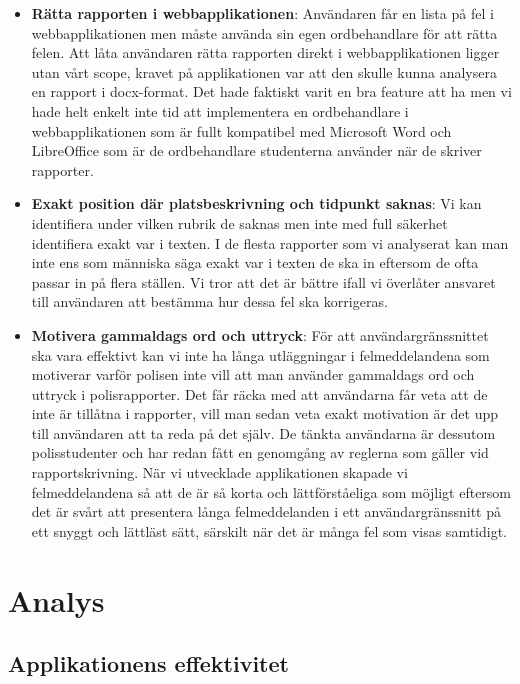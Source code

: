 \documentclass[swedish]{maucsthesis}
\begin{document}
\begin{itemize}
\item \textbf{Rätta rapporten i webbapplikationen}: Användaren får en lista på
  fel i webbapplikationen men måste använda sin egen ordbehandlare för att rätta
  felen. Att låta användaren rätta rapporten direkt i webbapplikationen ligger
  utan vårt scope, kravet på applikationen var att den skulle kunna analysera en
  rapport i docx-format. Det hade faktiskt varit en bra feature att ha men vi
  hade helt enkelt inte tid att implementera en ordbehandlare i
  webbapplikationen som är fullt kompatibel med Microsoft Word och LibreOffice som
  är de ordbehandlare studenterna använder när de skriver rapporter.
\item \textbf{Exakt position där platsbeskrivning och tidpunkt saknas}: Vi kan
  identifiera under vilken rubrik de saknas men inte med full säkerhet
  identifiera exakt var i texten. I de flesta rapporter som vi analyserat kan
  man inte ens som människa säga exakt var i texten de ska in eftersom de
  ofta passar in på flera ställen. Vi tror att det är bättre ifall vi överlåter
  ansvaret till användaren att bestämma hur dessa fel ska korrigeras.
\item \textbf{Motivera gammaldags ord och uttryck}: För att användargränssnittet
  ska vara effektivt kan vi inte ha långa utläggningar i felmeddelandena som
  motiverar varför polisen inte vill att man använder gammaldags ord och uttryck
  i polisrapporter. Det får räcka med att användarna får veta att de inte är
  tillåtna i rapporter, vill man sedan veta exakt motivation är det upp till
  användaren att ta reda på det själv. De tänkta användarna är dessutom
  polisstudenter och har redan fått en genomgång av reglerna som gäller vid
  rapportskrivning. När vi utvecklade applikationen skapade vi felmeddelandena
  så att de är så korta och lättförståeliga som möjligt eftersom det är svårt
  att presentera långa felmeddelanden i ett användargränssnitt på ett snyggt och
  lättläst sätt, särskilt när det är många fel som visas samtidigt.
\end{itemize}

\section{Analys}\label{analys}

\subsection{Applikationens effektivitet}
\end{document}

